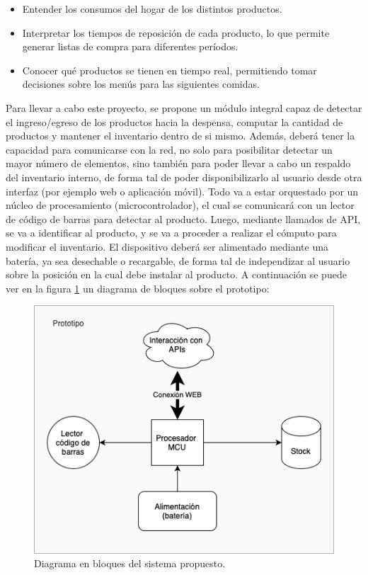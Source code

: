 \documentclass[
11pt, %
codirector, %
]{charter}
\begin{document}
\begin{itemize}
    \item Entender los consumos del hogar de los distintos productos.
    \item Interpretar los tiempos de reposición de cada producto, lo que permite generar listas de compra para diferentes períodos.
    \item Conocer qué productos se tienen en tiempo real, permitiendo tomar decisiones sobre los menús para las siguientes comidas.
\end{itemize}

Para llevar a cabo este proyecto, se propone un módulo integral capaz de detectar el ingreso/egreso de los productos hacia la despensa, computar la cantidad de productos y mantener el inventario dentro de si mismo. Además, deberá tener la capacidad para comunicarse con la red, no solo para posibilitar detectar un mayor número de elementos, sino también para poder llevar a cabo un respaldo del inventario interno, de forma tal de poder disponibilizarlo al usuario desde otra interfaz (por ejemplo web o aplicación móvil). 
Todo va a estar orquestado por un núcleo de procesamiento (microcontrolador), el cual se comunicará con un lector de código de barras para detectar al producto. Luego, mediante llamados de API, se va a identificar al producto, y se va a proceder a realizar el cómputo para modificar el inventario.
El dispositivo deberá ser alimentado mediante una batería, ya sea desechable o recargable, de forma tal de independizar al usuario sobre la posición en la cual debe instalar al producto.
A continuación se puede ver en la figura \ref{fig:diagBloques} un diagrama de bloques sobre el prototipo:

\begin{figure}[htpb]
\centering 
\includegraphics[width=.75\textwidth]{./Figuras/DiagramaBloque.png}
\caption{Diagrama en bloques del sistema propuesto.}
\label{fig:diagBloques}
\end{figure}
\end{document}
